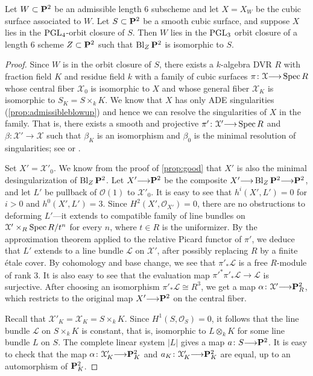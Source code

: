 \documentclass[12pt,reqno]{amsart}
\renewcommand{\k}{k}
\DeclareMathOperator{\Bl}{Bl}
\renewcommand{\to}{{\longrightarrow}}
\numberwithin{equation}{section}
\renewcommand{\O}{\mathcal O}
\begin{document}
\begin{proposition}\label{prop:cubictopoints}
  Let $W \subset \P^2$ be an admissible length 6 subscheme and let $X = X_W$ be the cubic surface associated to $W$.
  Let $S \subset \P^2$ be a smooth cubic surface, and suppose $X$ lies in the $\PGL_4$-orbit closure of $S$.
  Then $W$ lies in the $\PGL_3$ orbit closure of a length 6 scheme $Z \subset \P^2$ such that $\Bl_Z \P^2$ is isomorphic to $S$.
\end{proposition}
\begin{proof}
  Since $W$ is in the orbit closure of $S$, there exists a $\k$-algebra DVR $R$ with fraction field $K$ and residue field $k$ with a family of cubic surfaces $\pi \colon \mathcal X \to \spec R$ whose central fiber $\mathcal X_0$ is isomorphic to $X$ and whose general fiber $\mathcal X_K$ is isomorphic to $S_K = S \times_k K$.
  We know that $X$ has only ADE singularities (\autoref{prop:admissibleblowup}) and hence we can resolve the singularities of $X$ in the family.
  That is, there exists a smooth and projective $\pi' \colon \mathcal X' \to \spec R$ and $\beta \colon \mathcal X' \to \mathcal X$ such that $\beta_K$ is an isomorphism and $\beta_0$ is the minimal resolution of singularities; see \cite{bri:70} or \cite{tju:70}.

  Set $X' = \mathcal X'_0$.
  We know from the proof of \autoref{prop:good} that $X'$ is also the minimal desingularization of $\Bl_Z\P^2$.
  Let $X' \to \P^2$ be the composite $X' \to \Bl_Z \P^2 \to \P^2$, and let $L'$ be pullback of $\O(1)$ to $\mathcal X'_0$.
  It is easy to see that $h^i(X', L') = 0$ for $i > 0$ and $h^0(X', L') = 3$.
  Since $H^2(X', \O_{X'}) = 0$, there are no obstructions to deforming $L'$---it extends to compatible family of line bundles on $\mathcal X' \times_R \spec R/t^n$ for every $n$, where $t \in R$ is the uniformizer. 
  By the approximation theorem \cite{art:69} applied to the relative Picard functor of $\pi'$, we deduce that $L'$ extends to a line bundle $\mathcal L$ on $\mathcal X'$, after possibly replacing $R$ by a finite \'etale cover.
  By cohomology and base change, we see that $\pi'_* \mathcal L$ is a free $R$-module of rank 3.
  It is also easy to see that the evaluation map $\pi'^*\pi'_* \mathcal L \to \mathcal L$ is surjective.
  After choosing an isomorphism $\pi'_* \mathcal L \cong R^3$, we get a map $\alpha \colon \mathcal X' \to \P^2_R$, which restricts to the original map $X' \to \P^2$ on the central fiber.
  
  Recall that $\mathcal X'_K = \mathcal X_K = S \times_k K$.
  Since $H^1(S, \O_S) = 0$, it follows that the line bundle $\mathcal L$ on $S \times_k K$ is constant, that is, isomorphic to $L \otimes_k K$ for some line bundle $L$ on $S$.
  The complete linear system $|L|$ gives a map $a \colon S \to \P^2$.
  It is easy to check that the map $\alpha \colon \mathcal X'_K \to \P^2_K$ and $a_K \colon \mathcal X'_K \to \P^2_K$ are equal, up to an automorphism of $\P^2_K$.
  

\end{proof}
\end{document}
